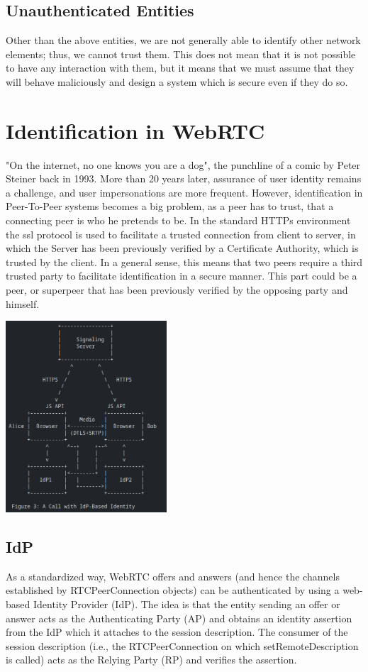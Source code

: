 \documentclass[conference]{IEEEtran}
\begin{document}
\subsection{Unauthenticated Entities}
Other than the above entities, we are not generally able to identify other network elements; thus, we cannot trust them. 
This does not mean that it is not possible to have any interaction with them, but it means that we must assume that they will 
behave maliciously and design a system which is secure even if they do so. \cite{RFC8827}

\section{Identification in WebRTC}
"On the internet, no one knows you are a dog", the punchline of a comic by Peter Steiner back in 1993.
More than 20 years later, assurance of user identity remains a challenge, and user impersonations are
more frequent. \cite{User_Identity_for_WebRTC_Services_A_Matter_of_Trust} However, identification in 
Peer-To-Peer systems becomes a big problem, as a peer has to trust, that a connecting peer is who he 
pretends to be. In the standard HTTPs environment the ssl
protocol is used to facilitate a trusted connection from client to server, in which the Server
has been previously verified by a Certificate Authority, which is trusted by the client. 
In a general sense, this means that two peers require a third trusted party to facilitate
identification in a secure manner.\cite{RFC8827} This part could be a peer, or superpeer that has been previously verified
by the opposing party and himself\cite{Security_Mechanisms_for_Signaling}.

\includegraphics[width=0.45\textwidth]{call with IdP Based Identity.png} %

\subsection{IdP}
As a standardized way, WebRTC offers and answers (and hence the channels established by
RTCPeerConnection objects) can be authenticated by using a web-based Identity
Provider (IdP). The idea is that the entity sending an offer or answer acts as the
Authenticating Party (AP) and obtains an identity assertion from the IdP which it
attaches to the session description. The consumer of the session description (i.e.,
the RTCPeerConnection on which setRemoteDescription is called) acts as the
Relying Party (RP) and verifies the assertion.\cite{WebRTC_Identity}
\end{document}
